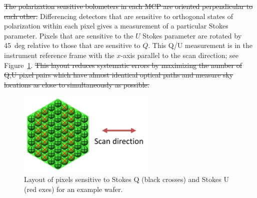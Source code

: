 \documentclass[]{spie}  %
\newcommand{\comb}[1]{\textcolor{blue}{#1}}
\begin{document}

\sout{The polarization sensitive bolometers in each MCP are oriented perpendicular to each other. }
Differencing detectors that are sensitive to orthogonal states of polarization within each pixel gives a measurement of 
a particular Stokes parameter. Pixels that are sensitive to the $U$ Stokes parameter are rotated by 45~deg relative to those
that are sensitive to $Q$. This Q/U measurement is in the instrument reference frame with the $x$-axis parallel to the scan 
direction; see Figure~\ref{fig:QU}. \sout{ This layout reduces systematic errors by maximizing the number of Q,U pixel pairs which have almost identical optical paths and measure sky locations as close to simultaneously as possible.  }

\begin{figure} [ht]
\begin{center}
\includegraphics[height=4cm]{QU_wafer.png}
\end{center}
\caption { \label{fig:QU} 
Layout of pixels sensitive to Stokes Q (black crosses) and Stokes U (red exes) for an example wafer.}
\end{figure}
\end{document}
